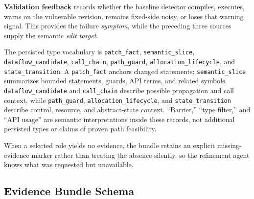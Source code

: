 \textbf{Validation feedback} records whether the baseline detector compiles, executes, warns on the vulnerable revision, remains fixed-side noisy, or loses that warning signal.  This provides the failure \emph{symptom}, while the preceding three sources supply the semantic \emph{edit target}.

The persisted type vocabulary is \texttt{patch\_fact}, \texttt{semantic\_slice}, \texttt{dataflow\_candidate}, \texttt{call\_chain}, \texttt{path\_guard}, \texttt{allocation\_lifecycle}, and \texttt{state\_transition}.  A \texttt{patch\_fact} anchors changed statements; \texttt{semantic\_slice} summarizes bounded statements, guards, API terms, and related symbols.  \texttt{dataflow\_candidate} and \texttt{call\_chain} describe possible propagation and call context, while \texttt{path\_guard}, \texttt{allocation\_lifecycle}, and \texttt{state\_transition} describe control, resource, and abstract-state context.  ``Barrier,'' ``type filter,'' and ``API usage'' are semantic interpretations inside these records, not additional persisted types or claims of proven path feasibility.

When a selected role yields no evidence, the bundle retains an explicit missing-evidence marker rather than treating the absence silently, so the refinement agent knows what was requested but unavailable.

\subsection{Evidence Bundle Schema}
\label{sec:evidence-schema}

